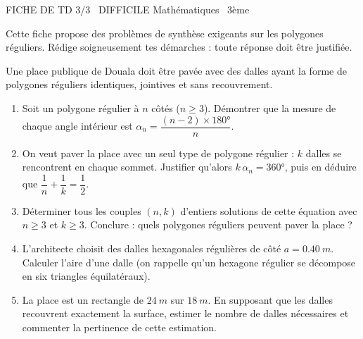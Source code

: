 \documentclass[11pt]{article}
\begin{document}
\begin{tcolorbox}[enhanced,colback=popink,colframe=popink,arc=10pt,boxrule=0pt,left=12pt,right=12pt,top=9pt,bottom=9pt]
{\color{white}\popxbold\small FICHE DE TD 3/3 \textbullet\ DIFFICILE \hfill Mathématiques \textbullet\ 3ème\par}
\end{tcolorbox}
\vspace{4pt}
Cette fiche propose des problèmes de synthèse exigeants sur les polygones réguliers. Rédige soigneusement tes démarches : toute réponse doit être justifiée.

\begin{exercice}
Une place publique de Douala doit être pavée avec des dalles ayant la forme de polygones réguliers identiques, jointives et sans recouvrement.
\begin{enumerate}
\item Soit un polygone régulier à $n$ côtés ($n \geq 3$). Démontrer que la mesure de chaque angle intérieur est $\alpha_n = \dfrac{(n-2)\times 180°}{n}$.
\item On veut paver la place avec un seul type de polygone régulier : $k$ dalles se rencontrent en chaque sommet. Justifier qu'alors $k\,\alpha_n = 360°$, puis en déduire que $\dfrac{1}{n}+\dfrac{1}{k}=\dfrac{1}{2}$.
\item Déterminer tous les couples $(n,k)$ d'entiers solutions de cette équation avec $n\geq 3$ et $k\geq 3$. Conclure : quels polygones réguliers peuvent paver la place ?
\item L'architecte choisit des dalles hexagonales régulières de côté $a = \SI{0,40}{m}$. Calculer l'aire d'une dalle (on rappelle qu'un hexagone régulier se décompose en six triangles équilatéraux).
\item La place est un rectangle de $\SI{24}{m}$ sur $\SI{18}{m}$. En supposant que les dalles recouvrent exactement la surface, estimer le nombre de dalles nécessaires et commenter la pertinence de cette estimation.
\end{enumerate}
\end{exercice}
\end{document}

